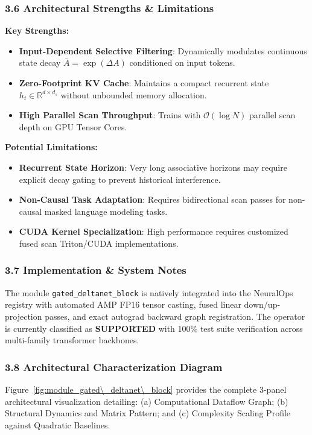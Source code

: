 \subsubsection*{3.6 Architectural Strengths \& Limitations}
\textbf{Key Strengths:}
\begin{itemize}
    \item \textbf{Input-Dependent Selective Filtering}: Dynamically modulates continuous state decay $\bar{A} = \exp(\Delta A)$ conditioned on input tokens.
    \item \textbf{Zero-Footprint KV Cache}: Maintains a compact recurrent state $h_t \in \mathbb{R}^{d \times d_s}$ without unbounded memory allocation.
    \item \textbf{High Parallel Scan Throughput}: Trains with $\mathcal{O}(\log N)$ parallel scan depth on GPU Tensor Cores.
\end{itemize}

\textbf{Potential Limitations:}
\begin{itemize}
    \item \textbf{Recurrent State Horizon}: Very long associative horizons may require explicit decay gating to prevent historical interference.
    \item \textbf{Non-Causal Task Adaptation}: Requires bidirectional scan passes for non-causal masked language modeling tasks.
    \item \textbf{CUDA Kernel Specialization}: High performance requires customized fused scan Triton/CUDA implementations.
\end{itemize}

\subsubsection*{3.7 Implementation \& System Notes}
The module \texttt{gated\_deltanet\_block} is natively integrated into the NeuralOps registry with automated AMP FP16 tensor casting, fused linear down/up-projection passes, and exact autograd backward graph registration. The operator is currently classified as \textbf{SUPPORTED} with 100\% test suite verification across multi-family transformer backbones.

\subsubsection*{3.8 Architectural Characterization Diagram}
Figure~\ref{fig:module_gated\_deltanet\_block} provides the complete 3-panel architectural visualization detailing: (a) Computational Dataflow Graph; (b) Structural Dynamics and Matrix Pattern; and (c) Complexity Scaling Profile against Quadratic Baselines.

